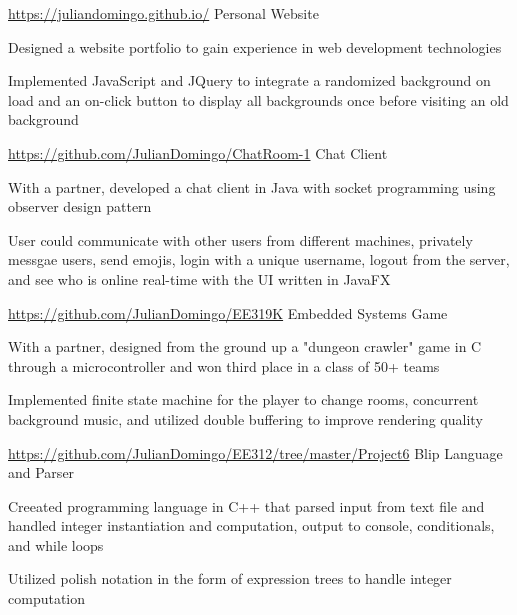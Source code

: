 \begin{cventries}
  \cventry
    {\url{https://juliandomingo.github.io/}}
    {Personal Website}
    {}
    {}
    {
      \begin{cvitems}
        \item Designed a website portfolio to gain experience in web development technologies
        \item Implemented JavaScript and JQuery to integrate a randomized background on load and an on-click button to display all backgrounds once before visiting an old background
      \end{cvitems}
    }
  \cventry
    {\url{https://github.com/JulianDomingo/ChatRoom-1}}
    {Chat Client}
    {}
    {}
    {
      \begin{cvitems}
        \item {With a partner, developed a chat client in Java with socket programming using observer design pattern}
        \item {User  could communicate with other users from different machines, privately messgae users, send emojis, login with a unique username, logout from the server, and see who is online real-time with the UI written in JavaFX}
      \end{cvitems}
    }
  \cventry
    {\url{https://github.com/JulianDomingo/EE319K}}
    {Embedded Systems Game}
    {}
    {}
    {
      \begin{cvitems}
        \item {With a partner, designed from the ground up a "dungeon crawler" game in C through a microcontroller and won third place in a class of 50+ teams}
        \item {Implemented finite state machine for the player to change rooms, concurrent background music, and utilized double buffering to improve rendering quality}
      \end{cvitems}
    }
  \cventry
    {\url{https://github.com/JulianDomingo/EE312/tree/master/Project6}}
    {Blip Language and Parser}
    {}
    {}
    {
      \begin{cvitems}
        \item {Creeated programming language in C++ that parsed input from text file and handled integer instantiation and computation, output to console, conditionals, and while loops}
        \item {Utilized polish notation in the form of expression trees to handle integer computation}
      \end{cvitems}
    }
\end{cventries}
